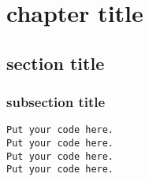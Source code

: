 \tableofcontents
\listoffigures

\chapter{chapter title}
\section{section title}
\subsection{subsection title}

\begin{lstlisting}
Put your code here.
Put your code here.
Put your code here.
Put your code here.
\end{lstlisting}

\lipsum[1-200]